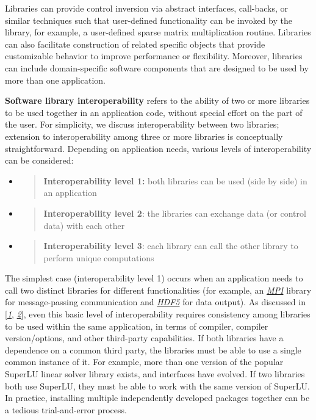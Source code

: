 \documentclass[]{article}
\begin{document}
Libraries can provide control inversion via abstract interfaces,
call-backs, or similar techniques such that user-defined functionality
can be invoked by the library, for example, a user-defined sparse matrix
multiplication routine. Libraries can also facilitate construction of
related specific objects that provide customizable behavior to improve
performance or flexibility. Moreover, libraries can include
domain-specific software components that are designed to be used by more
than one application.

\textbf{Software library interoperability} refers to the ability of two
or more libraries to be used together in an application code, without
special effort on the part of the user. For simplicity, we discuss
interoperability between two libraries; extension to interoperability
among three or more libraries is conceptually straightforward. Depending
on application needs, various levels of interoperability can be
considered:

\begin{itemize}
\item
  \begin{quote}
  \textbf{Interoperability level 1:} both libraries can be used (side by
  side) in an application
  \end{quote}
\item
  \begin{quote}
  \textbf{Interoperability level 2}: the libraries can exchange data (or
  control data) with each other
  \end{quote}
\end{itemize}

\begin{itemize}
\item
  \begin{quote}
  \textbf{Interoperability level 3}: each library can call the other
  library to perform unique computations
  \end{quote}
\end{itemize}

The simplest case (interoperability level 1) occurs when an application
needs to call two distinct libraries for different functionalities (for
example, an \href{http://www.mpi-forum.org}{\emph{MPI}} library for
message-passing communication and
\href{https://www.hdfgroup.org/HDF5/}{\emph{HDF5}} for data output). As
discussed in
{[}\href{https://figshare.com/articles/Package_Management_Practices_Essential_for_Interoperability_Lessons_Learned_and_Strategies_Developed_for_FASTMath/789055}{\emph{1}},
\href{https://wci.llnl.gov/codes/smartlibs/UCRL-JRNL-208636.pdf}{\emph{2}}{]},
even this basic level of interoperability requires consistency among
libraries to be used within the same application, in terms of compiler,
compiler version/options, and other third-party capabilities. If both
libraries have a dependence on a common third party, the libraries must
be able to use a single common instance of it. For example, more than
one version of the popular SuperLU linear solver library exists, and
interfaces have evolved. If two libraries both use SuperLU, they must be
able to work with the same version of SuperLU. In practice, installing
multiple independently developed packages together can be a tedious
trial-and-error process.
\end{document}
